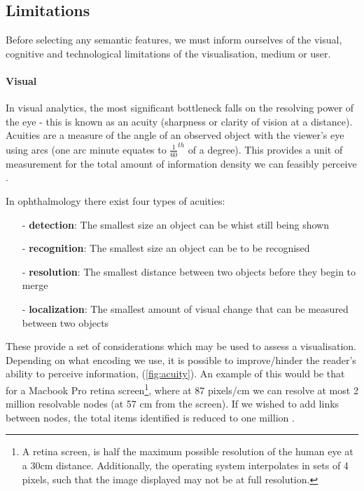 \subsection{Limitations}

Before selecting any semantic features, we must inform ourselves of the visual, cognitive and technological limitations of the visualisation, medium or user. 

\paragraph{Visual}
In visual analytics, the most significant bottleneck falls on the resolving power of the eye - this is known as an acuity (sharpness or clarity of vision at a distance). Acuities are a measure of the angle of an observed object with the viewer's eye using arcs (one arc minute equates to $\frac{1}{60}^{th}$ of a degree). This provides a unit of measurement for the total amount of information density we can feasibly perceive \citep{ware}. 

 In ophthalmology there exist four types of  acuities: 
\begin{itemize}
\item[-] \textbf{detection}: The smallest size an object can be whist still being shown
\item[-] \textbf{recognition}: The smallest size an object can be to be recognised
\item[-] \textbf{resolution}: The smallest distance between two objects before they begin to merge
\item[-] \textbf{localization}: The smallest amount of visual change that can be measured between two objects
\end{itemize}

These provide a set of considerations which may be used to assess a visualisation. Depending on what encoding we use, it is possible to improve/hinder the reader's ability to perceive information, (\autoref{fig:acuity}). An example of this would be that for a Macbook Pro retina screen\footnote{A retina screen, is half the maximum possible resolution of the human eye at a 30cm distance. Additionally, the operating system interpolates in sets of 4 pixels, such that the image displayed may not be at full resolution.}, where at 87 pixels/cm we can resolve at most 2 million resolvable nodes (at 57 cm from the screen). If we wished to add links between nodes, the total items identified is reduced to one million
\citep{ch10}. 


